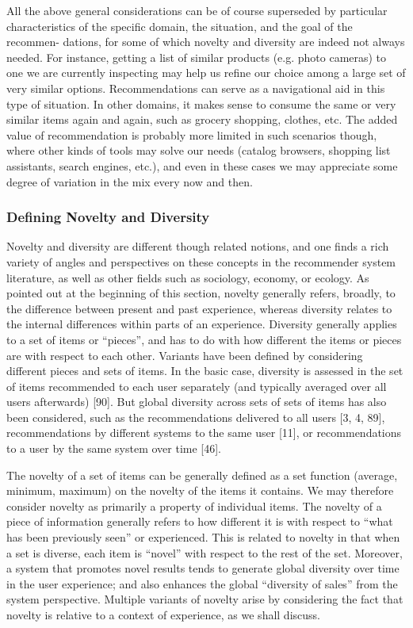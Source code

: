 All the above general considerations can be of course superseded by particular characteristics of the specific domain, the situation, and the goal of the recommen- dations, for some of which novelty and diversity are indeed not always needed. For instance, getting a list of similar products (e.g. photo cameras) to one we are currently inspecting may help us refine our choice among a large set of very similar options. Recommendations can serve as a navigational aid in this type of situation. In other domains, it makes sense to consume the same or very similar items again and again, such as grocery shopping, clothes, etc. The added value of recommendation is probably more limited in such scenarios though, where other kinds of tools may solve our needs (catalog browsers, shopping list assistants, search engines, etc.), and even in these cases we may appreciate some degree of variation in the mix every now and then.

\subsubsection{Defining Novelty and Diversity}

Novelty and diversity are different though related notions, and one finds a rich variety of angles and perspectives on these concepts in the recommender system literature, as well as other fields such as sociology, economy, or ecology. As pointed out at the beginning of this section, novelty generally refers, broadly, to the difference between present and past experience, whereas diversity relates to the internal differences within parts of an experience. Diversity generally applies to a set of items or “pieces”, and has to do with how different the items or pieces are with respect to each other. Variants have been defined by considering different pieces and sets of items. In the basic case, diversity is assessed in the set of items recommended to each user separately (and typically averaged over all users afterwards) [90]. But global diversity across sets of sets of items has also been considered, such as the recommendations delivered to all users [3, 4, 89], recommendations by different systems to the same user [11], or recommendations to a user by the same system over time [46].

The novelty of a set of items can be generally defined as a set function (average, minimum, maximum) on the novelty of the items it contains. We may therefore consider novelty as primarily a property of individual items. The novelty of a piece of information generally refers to how different it is with respect to “what has been previously seen” or experienced. This is related to novelty in that when a set is diverse, each item is “novel” with respect to the rest of the set. Moreover, a system that promotes novel results tends to generate global diversity over time in the user experience; and also enhances the global “diversity of sales” from the system perspective. Multiple variants of novelty arise by considering the fact that novelty is relative to a context of experience, as we shall discuss.

